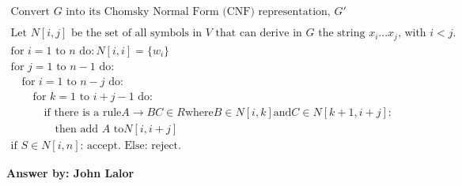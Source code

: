 \documentclass[12pt]{article}
\begin{document}
\begin{enumerate}
\begin{itemize}
\[
\begin{array}{l}
\textrm{Convert $G$ into its Chomsky Normal Form (CNF) representation, $G'$} \\ \\
\textrm{Let $N[i,j]$ be the set of all symbols in $V$ that can derive in $G$ the string $x_i...x_j$, with $i < j$.} \\
\textrm{for $i = 1$ to $n$ do}: N[i,i] = \{w_i\} \\
\textrm{for $j = 1$ to $n-1$ do}: \\
\quad \textrm{for $i = 1$ to $n-j$ do}: \\
\quad\quad \textrm{for $k = 1$ to $i+j-1$ do}: \\
\quad\quad\quad \textrm{if there is a rule} A \rightarrow BC \in R \textrm{where} B \in N[i,k] \textrm{and} C \in N[k+1,i+j]: \\
\quad\quad\quad\quad \textrm{then add $A$ to} N[i, i+j]\\
\textrm{if } S \in N[i,n] \textrm{: accept. Else: reject.} 
\end{array}
\]

\end{itemize}
{\bf Answer by: John Lalor} 

\end{enumerate}
\end{document}
